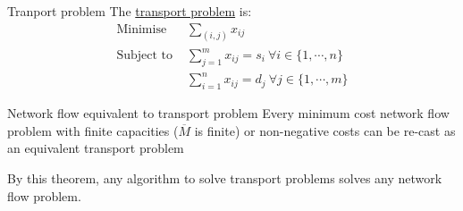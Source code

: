\documentclass[../Main.tex]{subfiles}
\begin{document}
\begin{definition}{Tranport problem}
    The \underline{transport problem} is:
    \begin{align*}
        \text{Minimise } &\sum_{(i, j)} x_{ij} \\
        \text{Subject to } &\sum_{j = 1}^m  x_{ij} = s_i~\forall i \in \{1, \cdots, n\} \\
        &\sum_{i = 1}^n x_{ij} = d_j~\forall j \in \{1, \cdots, m\}
    \end{align*}
\end{definition}
\begin{theorem}{Network flow equivalent to transport problem}
    Every minimum cost network flow problem with finite capacities ($\overline{M}$ is finite) or non-negative costs can be re-cast as an equivalent transport problem
    \label{thmFlowTransportEquiv}
\end{theorem}
\begin{remark}
    By this theorem, any algorithm to solve transport problems solves any network flow problem.
\end{remark}
\end{document}

